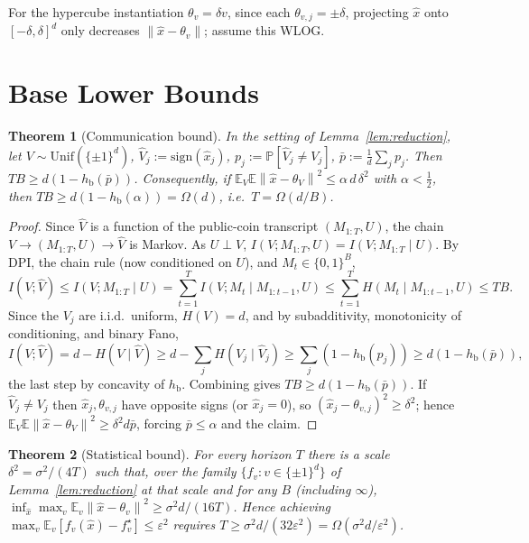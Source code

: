 \documentclass[11pt]{article}
\newtheorem{theorem}{Theorem}
\theoremstyle{definition}
\newcommand{\E}{\mathbb{E}}
\newcommand{\Prob}{\mathbb{P}}
\newcommand{\Unif}{\mathrm{Unif}}
\newcommand{\sign}{\mathrm{sign}}
\newcommand{\hb}{h_{\mathrm{b}}}
\newcommand{\eps}{\varepsilon}
\newcommand{\norm}[1]{\left\lVert #1 \right\rVert}
\begin{document}
\noindent For the hypercube instantiation $\theta_v=\delta v$, since each $\theta_{v,j}=\pm\delta$,
projecting $\hat x$ onto $[-\delta,\delta]^d$ only decreases $\norm{\hat x-\theta_v}$; assume this WLOG.

\section{Base Lower Bounds}
\label{sec:lower}

\begin{theorem}[Communication bound]
\label{thm:comm}
In the setting of Lemma~\ref{lem:reduction}, let $V\sim\Unif(\{\pm1\}^d)$, $\hat V_j:=\sign(\hat x_j)$,
$p_j:=\Prob[\hat V_j\neq V_j]$, $\bar p:=\tfrac1d\sum_j p_j$. Then $TB\ge d(1-\hb(\bar p))$.
Consequently, if $\E_V\E\norm{\hat x-\theta_V}^2\le\alpha\,d\,\delta^2$ with $\alpha<\tfrac12$, then
$TB\ge d(1-\hb(\alpha))=\Omega(d)$, i.e.\ $T=\Omega(d/B)$.
\end{theorem}

\begin{proof}
Since $\hat V$ is a function of the public-coin transcript $(M_{1:T},U)$, the chain
$V\to(M_{1:T},U)\to\hat V$ is Markov. As
$U\perp V$, $I(V;M_{1:T},U)=I(V;M_{1:T}\mid U)$. By DPI, the chain rule (now conditioned on $U$), and
$M_t\in\{0,1\}^B$,
\begin{equation}
I(V;\hat V)\le I(V;M_{1:T}\mid U)=\sum_{t=1}^T I(V;M_t\mid M_{1:t-1},U)\le\sum_{t=1}^T H(M_t\mid M_{1:t-1},U)\le TB.
\label{eq:upperMI}
\end{equation}
Since the $V_j$ are i.i.d.\ uniform, $H(V)=d$, and by subadditivity, monotonicity of conditioning, and
binary Fano,
\begin{equation}
I(V;\hat V)=d-H(V\mid\hat V)\ge d-\sum_j H(V_j\mid\hat V_j)\ge\sum_j(1-\hb(p_j))\ge d(1-\hb(\bar p)),
\label{eq:lowerMI}
\end{equation}
the last step by concavity of $\hb$. Combining gives $TB\ge d(1-\hb(\bar p))$. If $\hat V_j\neq V_j$ then
$\hat x_j,\theta_{v,j}$ have opposite signs (or $\hat x_j=0$), so $(\hat x_j-\theta_{v,j})^2\ge\delta^2$;
hence $\E_V\E\norm{\hat x-\theta_V}^2\ge\delta^2 d\bar p$, forcing $\bar p\le\alpha$ and the claim.
\end{proof}

\begin{theorem}[Statistical bound]
\label{thm:stat}
For every horizon $T$ there is a scale $\delta^2=\sigma^2/(4T)$ such that, over the family
$\{f_v:v\in\{\pm1\}^d\}$ of Lemma~\ref{lem:reduction} at that scale and for any $B$ (including $\infty$),
$\inf_{\hat x}\max_v\E_v\norm{\hat x-\theta_v}^2\ge\sigma^2 d/(16T)$. Hence achieving
$\max_v\E_v[f_v(\hat x)-f_v^\star]\le\eps^2$ requires $T\ge\sigma^2 d/(32\eps^2)=\Omega(\sigma^2 d/\eps^2)$.
\end{theorem}
\end{document}
